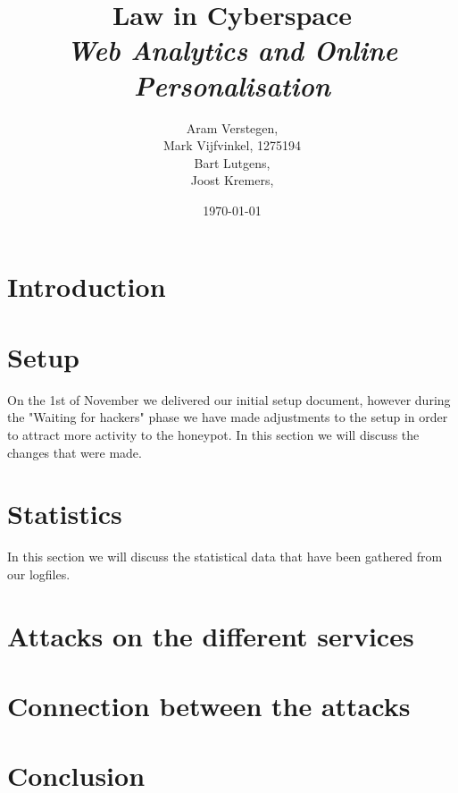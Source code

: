 \documentclass[11pt]{article}
\title{\textbf{Law in Cyberspace\\ \emph{Web Analytics and Online Personalisation}}}
\author{Aram Verstegen, \tocheck{studentnummer Utwente} \\
	 Mark Vijfvinkel, 1275194 \\
	 Bart Lutgens, \tocheck{studentnummer Utwente} \\
	Joost Kremers, \tocheck{studentnummer Utwente}}
\date{\today}
\begin{document}
\maketitle


\section{Introduction}


\section{Setup}
\label{Setup}

On the 1st of November we delivered our initial setup document, however during the "Waiting for hackers" phase we have made adjustments to the setup in order to attract more activity to the honeypot. In this section we will discuss the changes that were made.


\section{Statistics}
\label{Statistics}
In this section we will discuss the statistical data that have been gathered from our logfiles. 






\section{Attacks on the different services}
\label{Attacks}



\section{Connection between the attacks}
\label{Connection}

\section{Conclusion}
\label{Conclusion}






\end{document}
